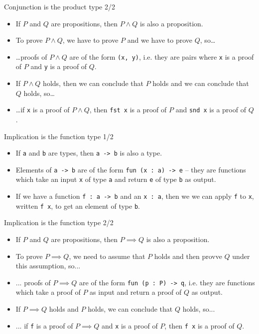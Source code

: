 \documentclass{beamer}
\newcommand{\m}[1]{\texttt{#1}}
\begin{document}
\begin{frame}{Conjunction is the product type 2/2}
\begin{itemize}
	\item If $P$ and $Q$ are propositions, then $P \land Q$ is also a proposition.
	\item To prove $P \land Q$, we have to prove $P$ and we have to prove $Q$, so\dots
	\item \dots proofs of $P \land Q$ are of the form \m{(x, y)}, i.e. they are pairs where \m{x} is a proof of $P$ and \m{y} is a proof of $Q$.
	\item If $P \land Q$ holds, then we can conclude that $P$ holds and we can conclude that $Q$ holds, so\dots
	\item \dots if \m{x} is a proof of $P \land Q$, then \m{fst x} is a proof of $P$ and \m{snd x} is a proof of $Q$.
\end{itemize}
\end{frame}

\begin{frame}{Implication is the function type 1/2}
\begin{itemize}
	\item If \m{a} and \m{b} are types, then \m{a -> b} is also a type.
	\item Elements of \m{a -> b} are of the form \m{fun (x :\ a) -> e} -- they are functions which take an input \m{x} of type \m{a} and return \m{e} of type \m{b} as output.
	\item If we have a function \m{f :\ a -> b} and an \m{x :\ a}, then we we can apply \m{f} to \m{x}, written \m{f x}, to get an element of type \m{b}.
\end{itemize}
\end{frame}

\begin{frame}{Implication is the function type 2/2}
\begin{itemize}
	\item If $P$ and $Q$ are propositions, then $P \implies Q$ is also a proposition.
	\item To prove $P \implies Q$, we need to assume that $P$ holds and then provve $Q$ under this assumption, so...
	\item ... proofs of $P \implies Q$ are of the form \m{fun (p :\ P) -> q}, i.e. they are functions which take a proof of $P$ as input and return a proof of $Q$ as output.
	\item If $P \implies Q$ holds and $P$ holds, we can conclude that $Q$ holds, so...
	\item ... if \m{f} is a proof of $P \implies Q$ and \m{x} is a proof of $P$, then \m{f x} is a proof of $Q$.
\end{itemize}
\end{frame}
\end{document}

